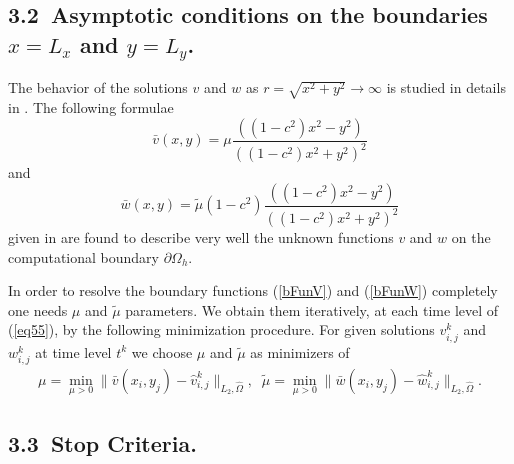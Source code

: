 \documentclass[leqno,11pt]{book}
\newcommand{\rf}[1]{(\ref{#1})}
\newcommand{\dO}{\partial\Omega_{h}}
\begin{document}
\subsection{3.2~Asymptotic conditions on the  boundaries $x=L_x$ and $y=L_y$.}

The behavior of the solutions $v$ and $w$  as $r =\sqrt{x^2 +y^2} \rightarrow \infty$ is studied in details in \cite{Ch2012,Ch2011,bnd}. The following formulae
\begin{equation}\label{bFunV}
\bar{v}(x,y) = \mu \frac{( (1-c^2)x^2-y^2 )}{((1-c^2)x^2 + y^2)^2 }
\end{equation}
and
\begin{equation}\label{bFunW}
\bar{w}(x,y) =\tilde {\mu} (1-c^2) \frac{( (1-c^2)x^2-y^2 )}{((1-c^2)x^2 + y^2)^2 }
\end{equation}
given in \cite{bnd} are found to describe very well the unknown functions $v$ and $w$ on the computational boundary $\dO$. 

In order to resolve the boundary functions \rf{bFunV} and \rf{bFunW} completely one needs $\mu$ and $\tilde {\mu}$ parameters.
We obtain them iteratively, at each time level of \rf{eq55}, by the following minimization procedure. For  given solutions  $v^k_{i,j}$ and $ w^k_{i,j}$ at time level $t^k$ 
we choose $\mu$ and $\tilde {\mu}$ as minimizers of 
\begin{equation}\label{mu}
\begin{split}
\mu = \underset{\mu>0 }{\operatorname{min} } \| \bar{v}(x_i,y_j) - \widehat{v}^k_{i,j} \|_{L_2,\widehat{\Omega}},
\;\;
\tilde {\mu} = \underset{\mu>0 }{\operatorname{min} } \| \bar{w}(x_i,y_j) -\widehat{w}^k_{i,j} \|_{L_2,\widehat{\Omega}}.
\end{split}
\end{equation}
 
\subsection{3.3~Stop Criteria.}
\end{document}
